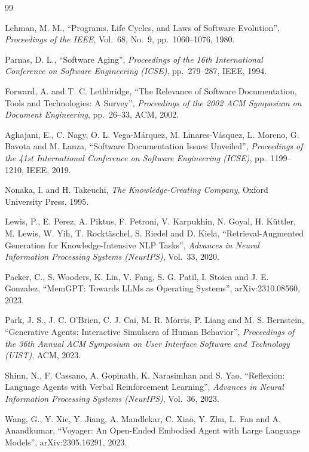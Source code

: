 \begin{thebibliography}{99}
\setlength{\itemsep}{0.6em}

 Lehman, M. M., ``Programs, Life Cycles, and Laws of Software Evolution'', \emph{Proceedings of the IEEE}, Vol.~68, No.~9, pp.~1060--1076, 1980.

 Parnas, D. L., ``Software Aging'', \emph{Proceedings of the 16th International Conference on Software Engineering (ICSE)}, pp.~279--287, IEEE, 1994.

 Forward, A. and T. C. Lethbridge, ``The Relevance of Software Documentation, Tools and Technologies: A Survey'', \emph{Proceedings of the 2002 ACM Symposium on Document Engineering}, pp.~26--33, ACM, 2002.

 Aghajani, E., C. Nagy, O. L. Vega-M\'{a}rquez, M. Linares-V\'{a}squez, L. Moreno, G. Bavota and M. Lanza, ``Software Documentation Issues Unveiled'', \emph{Proceedings of the 41st International Conference on Software Engineering (ICSE)}, pp.~1199--1210, IEEE, 2019.

 Nonaka, I. and H. Takeuchi, \emph{The Knowledge-Creating Company}, Oxford University Press, 1995.

 Lewis, P., E. Perez, A. Piktus, F. Petroni, V. Karpukhin, N. Goyal, H. K\"{u}ttler, M. Lewis, W. Yih, T. Rockt\"{a}schel, S. Riedel and D. Kiela, ``Retrieval-Augmented Generation for Knowledge-Intensive NLP Tasks'', \emph{Advances in Neural Information Processing Systems (NeurIPS)}, Vol.~33, 2020.

 Packer, C., S. Wooders, K. Lin, V. Fang, S. G. Patil, I. Stoica and J. E. Gonzalez, ``MemGPT: Towards LLMs as Operating Systems'', arXiv:2310.08560, 2023.

 Park, J. S., J. C. O'Brien, C. J. Cai, M. R. Morris, P. Liang and M. S. Bernstein, ``Generative Agents: Interactive Simulacra of Human Behavior'', \emph{Proceedings of the 36th Annual ACM Symposium on User Interface Software and Technology (UIST)}, ACM, 2023.

 Shinn, N., F. Cassano, A. Gopinath, K. Narasimhan and S. Yao, ``Reflexion: Language Agents with Verbal Reinforcement Learning'', \emph{Advances in Neural Information Processing Systems (NeurIPS)}, Vol.~36, 2023.

 Wang, G., Y. Xie, Y. Jiang, A. Mandlekar, C. Xiao, Y. Zhu, L. Fan and A. Anandkumar, ``Voyager: An Open-Ended Embodied Agent with Large Language Models'', arXiv:2305.16291, 2023.


\end{thebibliography}

